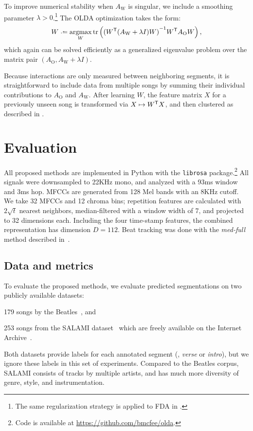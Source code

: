 \documentclass{article}
\begin{document}
To improve numerical stability when $A_\text{W}$ is singular, we include a smoothing parameter
$\lambda > 0$.\footnote{The same regularization strategy is applied to FDA in .} 
The OLDA optimization takes the form:
\begin{equation}
W \defeq \argmax_W \trace\left( {(W\trans (A_\text{W} + \lambda I) W)}^{-1} W\trans A_\text{O} W \right) \label{eq:olda},
\end{equation}
which again can be solved efficiently as a generalized eigenvalue problem over the matrix pair 
$(A_\text{O}, A_\text{W} + \lambda I)$.

Because interactions are only measured between neighboring segments, it is 
straightforward to include data from multiple songs by summing their individual contributions to $A_\text{O}$ and $A_\text{W}$.
After learning $W$, the feature matrix $X$ for a previously unseen song is transformed via $X \mapsto W^\mathsf{T} X$, and then 
clustered as described in .

\section{Evaluation}
\label{sec:eval}
All proposed methods are implemented in Python with the \texttt{librosa} package.\footnote{Code is
available at \url{https://github.com/bmcfee/olda}.}  
All signals were downsampled to 22KHz mono, and analyzed with a 93ms window and 3ms hop.  MFCCs are generated from 128 Mel bands
with an 8KHz cutoff. We take 32 MFCCs and 12 chroma bins; repetition features are calculated with $2\sqrt{t}$ nearest neighbors,
median-filtered with a window width of 7, and projected to 32 dimensions each.  Including the four time-stamp features, the combined
representation has dimension $D=112$. Beat tracking was done with the \emph{med-full} method described in~\cite{mcfee2014beat}.

\subsection{Data and metrics}
To evaluate the proposed methods, we evaluate predicted segmentations on two publicly available datasets:
\begin{description}\addtolength{\itemsep}{-0.25\baselineskip}%
\item[Beatles-ISO] 179 songs by the Beatles~\cite{harte2010towards,isophonicsbeatles}, and
\item[SALAMI-free] 253 songs from the SALAMI dataset~\cite{smith2011design} which are freely available on the 
Internet Archive~\cite{nieto2013convex}.
\end{description}
Both datasets provide labels for each annotated segment (\eg, \emph{verse} or \emph{intro}), but we ignore these
labels in this set of experiments. Compared to the Beatles corpus, SALAMI consists of tracks by multiple artists, 
and has much more diversity of genre, style, and instrumentation.
\end{document}
